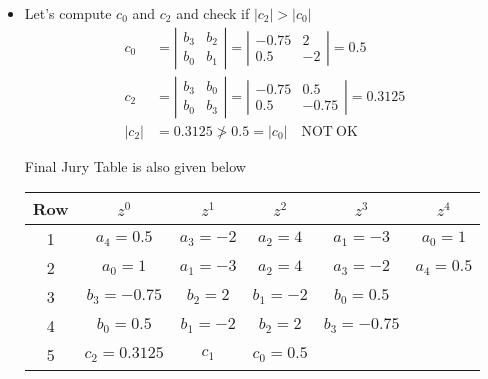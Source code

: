 \documentclass[twoside]{article}
\begin{document}
\begin{itemize}
\begin{align*}
                                                     \right| = -2
\\
b_2 &= \left| \begin{array}{cc} a_4 & a_1 \\ a_0 & a_3 \end{array}
                                                     \right| =  \left| \begin{array}{cc} 0.5 & -3 \\ 1 & -2 \end{array}
                                                     \right| = 2
\end{align*}
%
%
\item Let's compute $c_0$ and $c_2$ and check if $|c_2| > |c_0| $
%
\begin{align*}
  c_{0} &= \left| \begin{array}{cc} b_3 & b_2 \\ b_0 & b_1 \end{array}
                                                      \right| =
\left| \begin{array}{cc} -0.75 & 2 \\ 0.5 & -2 \end{array}
                                                      \right| = 0.5
\\
  c_{2} &= \left| \begin{array}{cc} b_3 & b_0 \\ b_0 & b_3 \end{array}
                                                      \right|
= \left| \begin{array}{cc} -0.75 & 0.5 \\ 0.5 & -0.75 \end{array}
                                                      \right| = 0.3125
\\
|c_2| &= 0.3125 \not> 0.5 =  |c_0| \quad \mathrm{NOT \ OK}
\end{align*}
%

Final Jury Table is also given below
%
\begin{center}
  \begin{tabular}{ | c || c c c c c |}
    \hline
    Row & $z^0$ & $z^1$ & $z^2$ & $z^3 $ & $z^4$ \\ \hline \hline
    1 & $a_4 = 0.5$ & $a_3 = -2$ & $a_2 = 4$ & $a_1 = -3$ & $a_0 = 1$ \\ \hline
    2 & $a_0 = 1$ & $a_1 = -3$ & $a_2 = 4$ & $a_3 = -2$ & $a_4 = 0.5$ \\ \hline
    3 & $b_3 = -0.75$ & $b_2 = 2$ & $b_1 = -2$ & $b_0 = 0.5$ &  \\ \hline
    4 & $b_0 = 0.5$ & $b_1 = -2$ & $b_2 = 2$ & $b_3 = -0.75$ &  \\ \hline
    5 & $c_2 = 0.3125$ & $c_1$ & $c_0 = 0.5$ &  &  \\ \hline
  \end{tabular}
\end{center}
%

\end{itemize}
%
\end{document}
